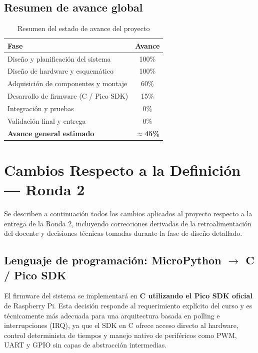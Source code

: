 \documentclass[12pt]{report}
\begin{document}
\section{Resumen de avance global}

\begin{table}[H]
\centering
\renewcommand{\arraystretch}{1.4}
\begin{tabular}{|l|c|}
\hline
\textbf{Fase} & \textbf{Avance} \\
\hline
Diseño y planificación del sistema & 100\% \\
Diseño de hardware y esquemático & 100\% \\
Adquisición de componentes y montaje & 60\% \\
Desarrollo de firmware (C / Pico SDK) & 15\% \\
Integración y pruebas & 0\% \\
Validación final y entrega & 0\% \\
\hline
\textbf{Avance general estimado} & \textbf{$\approx$45\%} \\
\hline
\end{tabular}
\caption{Resumen del estado de avance del proyecto}
\end{table}

\chapter{Cambios Respecto a la Definición — Ronda 2}

Se describen a continuación todos los cambios aplicados al proyecto respecto a la entrega de la Ronda 2, incluyendo correcciones derivadas de la retroalimentación del docente y decisiones técnicas tomadas durante la fase de diseño detallado.

\section{Lenguaje de programación: MicroPython $\rightarrow$ C / Pico SDK}

El firmware del sistema se implementará en \textbf{C utilizando el Pico SDK oficial} de Raspberry Pi. Esta decisión responde al requerimiento explícito del curso y es técnicamente más adecuada para una arquitectura basada en polling e interrupciones (IRQ), ya que el SDK en C ofrece acceso directo al hardware, control determinista de tiempos y manejo nativo de periféricos como PWM, UART y GPIO sin capas de abstracción intermedias.
\end{document}
